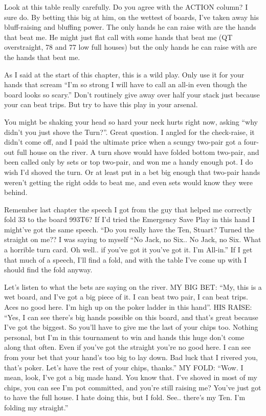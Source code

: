 Look at this table really carefully. Do you agree with the ACTION
column? I sure do. By betting this big at him, on the wettest of
boards, I've taken away his bluff-raising and bluffing power. The only
hands he can raise with are the hands that beat me. He might just
flat call with some hands that beat me (QT overstraight, 78 and 77 low
full houses) but the only hands he can raise with are the hands that
beat me.

As I said at the start of this chapter, this is a wild play. Only use it
for your hands that scream ``I'm so strong I will have to call an
all-in even though the board looks so scary.'' Don't routinely give
away over half your stack just because your can beat trips. But
try to have this play in your arsenal.

You might be shaking your head so hard your neck hurts right now,
asking ``why didn't you just shove the Turn?''. Great question. I
angled for the check-raise, it didn't come off, and I paid the
ultimate price when a scungy two-pair got a four-out full house on the
river. A turn shove would have folded bottom two-pair, and been called
only by sets or top two-pair, and won me a handy enough pot. I do wish
I'd shoved the turn. Or at least put in a bet big enough that two-pair
hands weren't getting the right odds to beat me, and even sets would
know they were behind.

Remember last chapter the speech I got from the guy that helped me
correctly fold 33 to the board 993T6? If I'd tried the Emergency Save
Play in this hand I might've got the same speech. ``Do you really have
the Ten, Stuart? Turned the straight on me?? I was saying to myself
``No Jack, no Six.. No Jack, no Six. What a horrible turn card. Oh
well.. if you've got it you've got it. I'm All-in.'' If I get that
much of a speech, I'll find a fold, and with the table I've come up
with I should find the fold anyway.

Let's listen to what the bets are saying on the river.
MY BIG BET: ``My, this is a wet board, and I've got a big piece of
it. I can beat two pair, I can beat trips. Aces no good here. I'm high
up on the poker ladder in this hand''.
HIS RAISE: ``Yes, I can see there's big hands possible on this board,
and that's great because I've got the biggest. So you'll have to give
me the last of your chips too. Nothing personal, but I'm in this
tournament to win and hands this huge don't come along that
often. Even if you've got the straight you're no good here. I can see
from your bet that your hand's too big to lay down. Bad luck that I
rivered you, that's poker. Let's have the rest of your chips,
thanks.''
MY FOLD: ``Wow. I mean, look, I've got a big made hand. You know
that. I've shoved in most of my chips, you can see I'm pot committed,
and you're still raising me? You've just got to have the full house. I
hate doing this, but I fold. See.. there's my Ten. I'm folding my
straight.''

